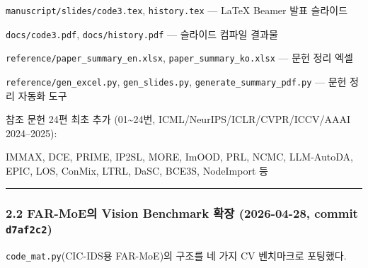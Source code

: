 \par\noindent \textbullet\enspace \texttt{manuscri\allowbreak{}pt/\allowbreak{}\allowbreak{}slide\allowbreak{}s/\allowbreak{}\allowbreak{}code3.\allowbreak{}tex}, \texttt{history.\allowbreak{}tex} — LaTeX Beamer 발표 슬라이드


\par\noindent \textbullet\enspace \texttt{docs/\allowbreak{}\allowbreak{}cod\allowbreak{}e3.\allowbreak{}pdf}, \texttt{docs/\allowbreak{}\allowbreak{}his\allowbreak{}tory.\allowbreak{}pdf\allowbreak{}} — 슬라이드 컴파일 결과물


\par\noindent \textbullet\enspace \texttt{referenc\allowbreak{}e/\allowbreak{}\allowbreak{}paper\_\allowbreak{}\allowbreak{}summary\_\allowbreak{}\allowbreak{}en.\allowbreak{}xlsx}, \texttt{paper\_\allowbreak{}\allowbreak{}su\allowbreak{}mmary\_\allowbreak{}\allowbreak{}ko\allowbreak{}.\allowbreak{}xlsx} — 문헌 정리 엑셀


\par\noindent \textbullet\enspace \texttt{referenc\allowbreak{}e/\allowbreak{}\allowbreak{}gen\_\allowbreak{}\allowbreak{}ex\allowbreak{}cel.\allowbreak{}py}, \texttt{gen\_\allowbreak{}\allowbreak{}slid\allowbreak{}es.\allowbreak{}py}, \texttt{generate\allowbreak{}\_\allowbreak{}\allowbreak{}summary\allowbreak{}\_\allowbreak{}\allowbreak{}pdf.\allowbreak{}py} — 문헌 정리 자동화 도구


참조 문헌 24편 최초 추가 (01\textasciitilde{}24번, ICML/\allowbreak{}NeurIPS/\allowbreak{}ICLR/\allowbreak{}CVPR/\allowbreak{}ICCV/\allowbreak{}AAAI 2024–2025):

IMMAX, DCE, PRIME, IP2SL, MORE, ImOOD, PRL, NCMC, LLM-AutoDA, EPIC, LOS, ConMix, LTRL, DaSC, BCE3S, NodeImport 등




\medskip\hrule\medskip
\subsubsection{2.2 FAR-MoE의 Vision Benchmark 확장 (2026-04-28, commit \texttt{d7af2c2})}
\texttt{code\_\allowbreak{}\allowbreak{}mat\allowbreak{}.\allowbreak{}py}(CIC-IDS용 FAR-MoE)의 구조를 네 가지 CV 벤치마크로 포팅했다.

